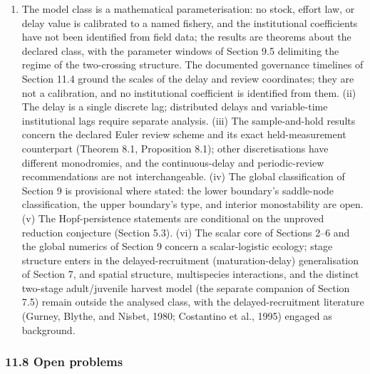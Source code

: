 \documentclass[11pt]{article}
\providecommand{\tightlist}{\setlength{\itemsep}{0pt}\setlength{\parskip}{0pt}}
\begin{document}
\begin{enumerate}
\def\labelenumi{(\roman{enumi})}
\tightlist
\item
  The model class is a mathematical parameterisation: no stock, effort
  law, or delay value is calibrated to a named fishery, and the
  institutional coefficients have not been identified from field data;
  the results are theorems about the declared class, with the parameter
  windows of Section 9.5 delimiting the regime of the two-crossing
  structure. The documented governance timelines of Section 11.4 ground
  the scales of the delay and review coordinates; they are not a
  calibration, and no institutional coefficient is identified from them.
  (ii) The delay is a single discrete lag; distributed delays and
  variable-time institutional lags require separate analysis. (iii) The
  sample-and-hold results concern the declared Euler review scheme and
  its exact held-measurement counterpart (Theorem 8.1, Proposition 8.1);
  other discretisations have different monodromies, and the
  continuous-delay and periodic-review recommendations are not
  interchangeable. (iv) The global classification of Section 9 is
  provisional where stated: the lower boundary's saddle-node
  classification, the upper boundary's type, and interior monostability
  are open. (v) The Hopf-persistence statements are conditional on the
  unproved reduction conjecture (Section 5.3). (vi) The scalar core of
  Sections 2--6 and the global numerics of Section 9 concern a
  scalar-logistic ecology; stage structure enters in the
  delayed-recruitment (maturation-delay) generalisation of Section 7,
  and spatial structure, multispecies interactions, and the distinct
  two-stage adult/juvenile harvest model (the separate companion of
  Section 7.5) remain outside the analysed class, with the
  delayed-recruitment literature (Gurney, Blythe, and Nisbet, 1980;
  Costantino et al., 1995) engaged as background.
\end{enumerate}

\subsubsection{11.8 Open problems}\label{open-problems}
\end{document}
